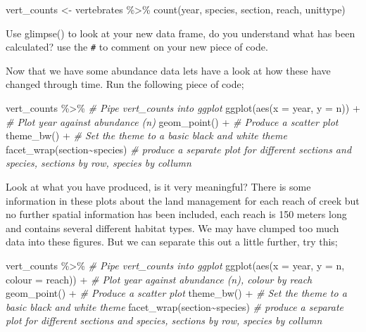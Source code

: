 \documentclass[
]{book}
\newenvironment{Shaded}{\begin{snugshade}}{\end{snugshade}}
\newcommand{\AttributeTok}[1]{\textcolor[rgb]{0.77,0.63,0.00}{#1}}
\newcommand{\CommentTok}[1]{\textcolor[rgb]{0.56,0.35,0.01}{\textit{#1}}}
\newcommand{\FunctionTok}[1]{\textcolor[rgb]{0.00,0.00,0.00}{#1}}
\newcommand{\NormalTok}[1]{#1}
\newcommand{\OtherTok}[1]{\textcolor[rgb]{0.56,0.35,0.01}{#1}}
\newcommand{\SpecialCharTok}[1]{\textcolor[rgb]{0.00,0.00,0.00}{#1}}
\begin{document}
\begin{Shaded}
\begin{Highlighting}[]
\NormalTok{vert\_counts }\OtherTok{\textless{}{-}}\NormalTok{ vertebrates }\SpecialCharTok{\%\textgreater{}\%} 
  \FunctionTok{count}\NormalTok{(year, species, section, reach, unittype) }
\end{Highlighting}
\end{Shaded}

Use glimpse() to look at your new data frame, do you understand what has been calculated? use the \texttt{\#} to comment on your new piece of code.

Now that we have some abundance data lets have a look at how these have changed through time. Run the following piece of code;

\begin{Shaded}
\begin{Highlighting}[]
\NormalTok{vert\_counts }\SpecialCharTok{\%\textgreater{}\%} \CommentTok{\# Pipe vert\_counts into ggplot}
  \FunctionTok{ggplot}\NormalTok{(}\FunctionTok{aes}\NormalTok{(}\AttributeTok{x =}\NormalTok{ year, }\AttributeTok{y =}\NormalTok{ n)) }\SpecialCharTok{+} \CommentTok{\# Plot year against abundance (n)}
  \FunctionTok{geom\_point}\NormalTok{() }\SpecialCharTok{+} \CommentTok{\# Produce a scatter plot}
  \FunctionTok{theme\_bw}\NormalTok{() }\SpecialCharTok{+} \CommentTok{\# Set the theme to a basic black and white theme }
  \FunctionTok{facet\_wrap}\NormalTok{(section}\SpecialCharTok{\textasciitilde{}}\NormalTok{species) }\CommentTok{\# produce a separate plot for different sections and species, sections by row, species by collumn}
\end{Highlighting}
\end{Shaded}

Look at what you have produced, is it very meaningful? There is some information in these plots about the land management for each reach of creek but no further spatial information has been included, each reach is 150 meters long and contains several different habitat types. We may have clumped too much data into these figures. But we can separate this out a little further, try this;

\begin{Shaded}
\begin{Highlighting}[]
\NormalTok{vert\_counts }\SpecialCharTok{\%\textgreater{}\%} \CommentTok{\# Pipe vert\_counts into ggplot}
  \FunctionTok{ggplot}\NormalTok{(}\FunctionTok{aes}\NormalTok{(}\AttributeTok{x =}\NormalTok{ year, }\AttributeTok{y =}\NormalTok{ n, }\AttributeTok{colour =}\NormalTok{ reach)) }\SpecialCharTok{+} \CommentTok{\# Plot year against abundance (n), colour by reach}
  \FunctionTok{geom\_point}\NormalTok{() }\SpecialCharTok{+} \CommentTok{\# Produce a scatter plot}
  \FunctionTok{theme\_bw}\NormalTok{() }\SpecialCharTok{+} \CommentTok{\# Set the theme to a basic black and white theme }
  \FunctionTok{facet\_wrap}\NormalTok{(section}\SpecialCharTok{\textasciitilde{}}\NormalTok{species) }\CommentTok{\# produce a separate plot for different sections and species, sections by row, species by collumn}
\end{Highlighting}
\end{Shaded}
\end{document}

